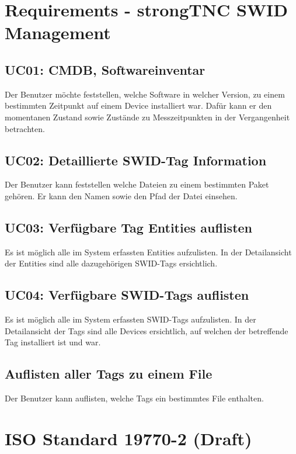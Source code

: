 \section{Requirements - strongTNC SWID Management}

\subsection{UC01: CMDB, Softwareinventar}

Der Benutzer möchte feststellen, welche Software in welcher Version, zu einem
bestimmten Zeitpunkt auf einem Device installiert war. Dafür kann er den
momentanen Zustand sowie Zustände zu Messzeitpunkten in der Vergangenheit
betrachten.

\subsection{UC02: Detaillierte SWID-Tag Information}

Der Benutzer kann feststellen welche Dateien zu einem bestimmten Paket gehören.
Er kann den Namen sowie den Pfad der Datei einsehen.

\subsection{UC03: Verfügbare Tag Entities auflisten}

Es ist möglich alle im System erfassten Entities aufzulisten. In der
Detailansicht der Entities sind alle dazugehörigen SWID-Tags ersichtlich.

\subsection{UC04: Verfügbare SWID-Tags auflisten}

Es ist möglich alle im System erfassten SWID-Tags aufzulisten. In der
Detailansicht der Tags sind alle Devices ersichtlich, auf welchen der
betreffende Tag installiert ist und war.

\subsection{Auflisten aller Tags zu einem File}

Der Benutzer kann auflisten, welche Tags ein bestimmtes File enthalten.


\section{ISO Standard 19770-2 (Draft)}

